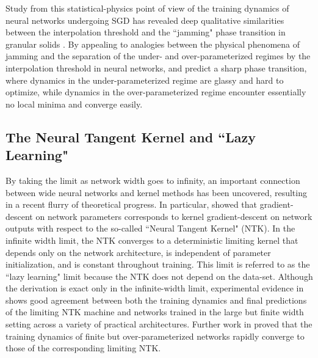 \documentclass[a4paper, 12pt]{article}
\begin{document}
Study from this statistical-physics point of view of the training dynamics of neural networks undergoing SGD has revealed deep qualitative similarities between the interpolation threshold and the ``jamming" phase transition in granular solids \cite{baity-jesiComparingDynamicsDeep2019, geigerJammingTransitionParadigm2019}. By appealing to analogies between the physical phenomena of jamming and the separation of the under- and over-parameterized regimes by the interpolation threshold in neural networks, \cite{geigerJammingTransitionParadigm2019} and \cite{spiglerJammingTransitionOverparametrization2019} predict a sharp phase transition, where dynamics in the under-parameterized regime are glassy and hard to optimize, while dynamics in the over-parameterized regime encounter essentially no local minima and converge easily.

\subsection{The Neural Tangent Kernel and ``Lazy Learning"}

By taking the limit as network width goes to infinity, an important connection between wide neural networks and kernel methods has been uncovered, resulting in a recent flurry of theoretical progress. In particular, \cite{jacotNeuralTangentKernel2018} showed that gradient-descent on network parameters corresponds to kernel gradient-descent on network outputs with respect to the so-called ``Neural Tangent Kernel" (NTK). In the infinite width limit, the NTK converges to a deterministic limiting kernel that depends only on the network architecture, is independent of parameter initialization, and is constant throughout training. This limit is referred to as the ``lazy learning" limit because the NTK does not depend on the data-set. Although the derivation is exact only in the infinite-width limit, experimental evidence in \cite{jacotNeuralTangentKernel2018} shows good agreement between both the training dynamics and final predictions of the limiting NTK machine and networks trained in the large but finite width setting across a variety of practical architectures. Further work in \cite{allen-zhuConvergenceTheoryDeep2019} proved that the training dynamics of finite but over-parameterized networks rapidly converge to those of the corresponding limiting NTK.\\
\end{document}
